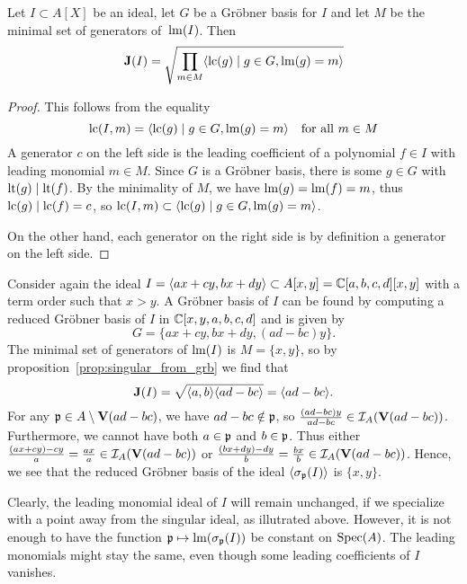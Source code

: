 \begin{proposition}\label{prop:singular_from_grb}
  Let $I \subset A[X]$ be an ideal, let $G$ be a Gröbner basis for $I$ and let $M$ be the minimal set of generators of $\,\operatorname{lm}(I)$. Then
  \[\operatorname{\mathbf J}(I) = \sqrt{\prod_{m \in M} \langle \operatorname{lc}(g) \mid g \in G, \operatorname{lm}(g) = m \rangle }\]
\end{proposition}
\begin{proof}
  This follows from the equality
  \[\operatorname{lc}(I, m) = \langle \operatorname{lc}(g) \mid g \in G, \operatorname{lm}(g) = m \rangle \quad \text{for all $m \in M$} \]
  A generator $c$ on the left side is the leading coefficient of a polynomial $f \in I$ with leading monomial $m \in M$. Since $G$ is a Gröbner basis, there is some $g \in G$ with $\operatorname{lt}(g) \mid \operatorname{lt}(f)$. By the minimality of $M$, we have $\operatorname{lm}(g) = \operatorname{lm}(f) = m$, thus $\operatorname{lc}(g) \mid \operatorname{lc}(f) = c$, so $\operatorname{lc}(I, m) \subset \langle \operatorname{lc}(g) \mid g \in G, \operatorname{lm}(g) = m \rangle$.

  On the other hand, each generator on the right side is by definition a generator on the left side.
\end{proof}

\begin{example}\upshape
  Consider again the ideal $I = \langle ax + cy, bx + dy \rangle \subset A[x, y] = \mathbb{C}[a, b, c, d][x, y]$ with a term order such that $x > y$. A Gröbner basis of $I$ can be found by computing a reduced Gröbner basis of $I$ in $\mathbb{C}[x, y, a, b, c, d]$ and is given by
  \[G = \{ax + cy, bx + dy, (ad - bc)y\}.\]
  The minimal set of generators of $\operatorname{lm}(I)$ is $M = \{x, y\}$, so by proposition~\ref{prop:singular_from_grb} we find that
  \[\operatorname{\mathbf J}(I) = \sqrt{\langle a, b \rangle \langle ad - bc \rangle} = \langle ad - bc \rangle.\]
  For any $\mathfrak p \in A \setminus \operatorname{\mathbf V}(ad - bc)$, we have $ad - bc \notin \mathfrak p$, so $\frac{(ad - bc)y}{ad - bc} \in \mathcal I_{A}(\operatorname{\mathbf V}(ad - bc))$. Furthermore, we cannot have both $a \in \mathfrak p$ and $b \in \mathfrak p$. Thus either $\frac{(ax + cy) - cy}{a} = \frac{ax}{a} \in \mathcal I_{A}(\operatorname{\mathbf V}(ad - bc))$ or $\frac{(bx + dy) - dy}{b} = \frac{bx}{b} \in \mathcal I_{A}(\operatorname{\mathbf V}(ad - bc))$. Hence, we see that the reduced Gröbner basis of the ideal $\langle \sigma_{\mathfrak p}(I) \rangle$ is $\{x, y\}$.
\end{example}


Clearly, the leading monomial ideal of $I$ will remain unchanged, if we specialize with a point away from the singular ideal, as illutrated above. However, it is not enough to have the function $\mathfrak p \mapsto \operatorname{lm}(\sigma_{\mathfrak p}(I))$ be constant on $\operatorname{Spec}(A)$. The leading monomials might stay the same, even though some leading coefficients of $I$ vanishes.

